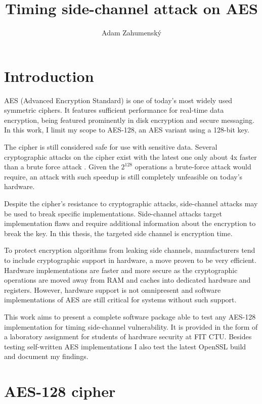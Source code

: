 \documentclass[thesis=B,english]{FITthesis}[2019/03/06]
\title{Timing side-channel attack on AES}
\author{Adam Zahumenský} %
\begin{document}

\chapter{Introduction}

AES (Advanced Encryption Standard) is one of today's most widely used symmetric ciphers.
It features sufficient performance for real-time data encryption, being featured prominently in disk encryption and secure messaging.
In this work, I limit my scope to AES-128, an AES variant using a 128-bit key.

The cipher is still considered safe for use with sensitive data. 
Several cryptographic attacks on the cipher exist with the latest one only about 4x faster than a brute force attack \cite{bogdanov2011biclique}.
Given the $2^{128}$ operations a brute-force attack would require, an attack with such speedup is still completely unfeasible on today's hardware.

Despite the cipher's resistance to cryptographic attacks, side-channel attacks may be used to break specific implementations.
Side-channel attacks target implementation flaws and require additional information about the encryption to break the key.
In this thesis, the targeted side channel is encryption time.

To protect encryption algorithms from leaking side channels, manufacturers tend to include cryptographic support in hardware, a move proven to be very efficient.
Hardware implementations are faster and more secure as the cryptographic operations are moved away from RAM and caches into dedicated hardware and registers.
However, hardware support is not omnipresent and software implementations of AES are still critical for systems without such support.

This work aims to present a complete software package able to test any AES-128 implementation for timing side-channel vulnerability.
It is provided in the form of a laboratory assignment for students of hardware security at FIT CTU.
Besides testing self-written AES implementations I also test the latest OpenSSL build and document my findings.


\chapter{AES-128 cipher}
\end{document}
